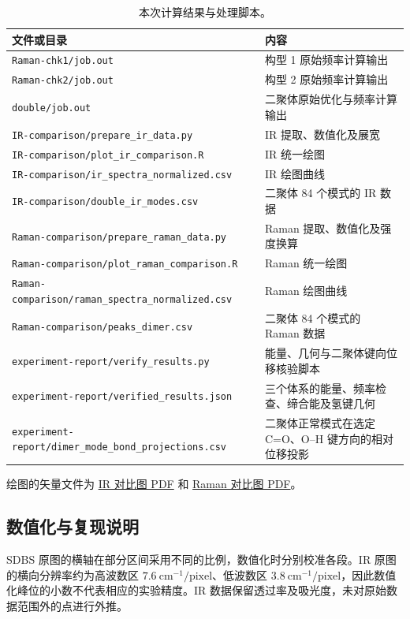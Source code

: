 \documentclass[a4paper,12pt]{article}
\begin{document}
\begin{table}[htbp]
\centering
\caption{本次计算结果与处理脚本。}\label{tab:5}
\begingroup\footnotesize\setlength{\tabcolsep}{4pt}
\begin{tabularx}{\textwidth}{YY}
\toprule
文件或目录 & 内容 \\
\midrule
\nolinkurl{Raman-chk1/job.out} & 构型 1 原始频率计算输出 \\
\nolinkurl{Raman-chk2/job.out} & 构型 2 原始频率计算输出 \\
\nolinkurl{double/job.out} & 二聚体原始优化与频率计算输出 \\
\nolinkurl{IR-comparison/prepare_ir_data.py} & IR 提取、数值化及展宽 \\
\nolinkurl{IR-comparison/plot_ir_comparison.R} & IR 统一绘图 \\
\nolinkurl{IR-comparison/ir_spectra_normalized.csv} & IR 绘图曲线 \\
\nolinkurl{IR-comparison/double_ir_modes.csv} & 二聚体 84 个模式的 IR 数据 \\
\nolinkurl{Raman-comparison/prepare_raman_data.py} & Raman 提取、数值化及强度换算 \\
\nolinkurl{Raman-comparison/plot_raman_comparison.R} & Raman 统一绘图 \\
\nolinkurl{Raman-comparison/raman_spectra_normalized.csv} & Raman 绘图曲线 \\
\nolinkurl{Raman-comparison/peaks_dimer.csv} & 二聚体 84 个模式的 Raman 数据 \\
\nolinkurl{experiment-report/verify_results.py} & 能量、几何与二聚体键向位移核验脚本 \\
\nolinkurl{experiment-report/verified_results.json} & 三个体系的能量、频率检查、缔合能及氢键几何 \\
\nolinkurl{experiment-report/dimer_mode_bond_projections.csv} & 二聚体正常模式在选定 C=O、O–H 键方向的相对位移投影 \\
\bottomrule
\end{tabularx}
\endgroup
\end{table}

绘图的矢量文件为 \href{../IR-comparison/ir_comparison.pdf}{IR 对比图 PDF} 和 \href{../Raman-comparison/raman_comparison.pdf}{Raman 对比图 PDF}。

\subsection{数值化与复现说明}

SDBS 原图的横轴在部分区间采用不同的比例，数值化时分别校准各段。IR 原图的横向分辨率约为高波数区 $7.6\ \mathrm{cm^{-1}/pixel}$、低波数区 $3.8\ \mathrm{cm^{-1}/pixel}$，因此数值化峰位的小数不代表相应的实验精度。IR 数据保留透过率及吸光度，未对原始数据范围外的点进行外推。
\end{document}

